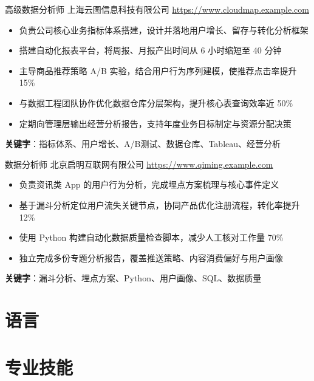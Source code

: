 \documentclass[a4paper, serif, 10pt]{moderncv}
\begin{document}
        {高级数据分析师}
        {上海云图信息科技有限公司}
        {\url{https://www.cloudmap.example.com}}
        {}
        {\begin{itemize}
\item 负责公司核心业务指标体系搭建，设计并落地用户增长、留存与转化分析框架
\item 搭建自动化报表平台，将周报、月报产出时间从 6 小时缩短至 40 分钟
\item 主导商品推荐策略 A/B 实验，结合用户行为序列建模，使推荐点击率提升 15\%
\item 与数据工程团队协作优化数据仓库分层架构，提升核心表查询效率近 50\%
\item 定期向管理层输出经营分析报告，支持年度业务目标制定与资源分配决策
\end{itemize}
\textbf{关键字}：指标体系、用户增长、A/B测试、数据仓库、Tableau、经营分析}

        {数据分析师}
        {北京启明互联网有限公司}
        {\url{https://www.qiming.example.com}}
        {}
        {\begin{itemize}
\item 负责资讯类 App 的用户行为分析，完成埋点方案梳理与核心事件定义
\item 基于漏斗分析定位用户流失关键节点，协同产品优化注册流程，转化率提升 12\%
\item 使用 Python 构建自动化数据质量检查脚本，减少人工核对工作量 70\%
\item 独立完成多份专题分析报告，覆盖推送策略、内容消费偏好与用户画像
\end{itemize}
\textbf{关键字}：漏斗分析、埋点方案、Python、用户画像、SQL、数据质量}
\section{语言}

\section{专业技能}

\end{document}
